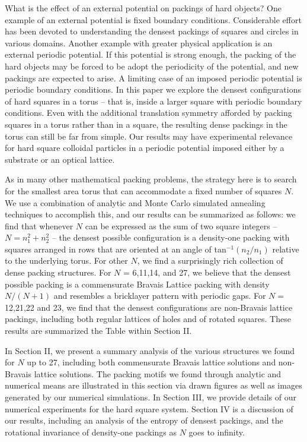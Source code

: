 \documentclass{umthesis}          %
\begin{document}
What is the effect of an external potential on packings of hard objects? One example of an external potential is fixed boundary conditions.  Considerable effort has been devoted to understanding the densest packings of squares and circles in various domains.  Another example with greater physical application is an external periodic potential.  If this potential is strong enough, the packing of the hard objects may be forced to be adopt the periodicity of the potential, and new packings are expected to arise.  A limiting case of an imposed periodic potential is periodic boundary conditions.  In this paper we explore the densest configurations of hard squares in a torus -- that is, inside a larger square with periodic boundary conditions.  Even with the additional translation symmetry afforded by packing squares in a torus rather than in a square, the resulting dense packings in the torus can still be far from simple. Our results may have experimental relevance for hard square colloidal particles in a periodic potential imposed either by a substrate or an optical lattice.

As in many other mathematical packing problems, the strategy here is to search for the smallest area torus that can accommodate a fixed number of squares $N$.  We use a combination of analytic and Monte Carlo simulated annealing techniques to accomplish this, and our results can be summarized as follows: we find that whenever $N$ can be expressed as the sum of two square integers -- $N=n_1^2+n_2^2$ -- the densest possible configuration is a density-one packing with squares arranged in rows that are oriented at an angle of tan$^{-1}(n_2/n_1)$ relative to the underlying torus.  For other $N$, we find a surprisingly rich collection of dense packing structures. For $N$ = 6,11,14, and 27, we believe that the densest possible packing is a commensurate Bravais Lattice packing with density $N/(N+1)$ and resembles a bricklayer pattern with periodic gaps.  For $N=$ 12,21,22 and 23, we find that the densest configurations are non-Bravais lattice packings, including both regular lattices of holes and of rotated squares. These results are summarized the Table within Section II.

In Section II, we present a summary analysis of the various structures we found for $N$ up to 27, including both commensurate Bravais lattice solutions and non-Bravais lattice solutions.  The packing motifs we found through analytic and numerical means are illustrated in this section via drawn figures as well as images generated by our numerical simulations. In Section III, we provide details of our numerical experiments for the hard square system. Section IV is a discussion of our results, including an analysis of the entropy of densest packings, and the rotational invariance of density-one packings as $N$ goes to infinity. 
\end{document}
